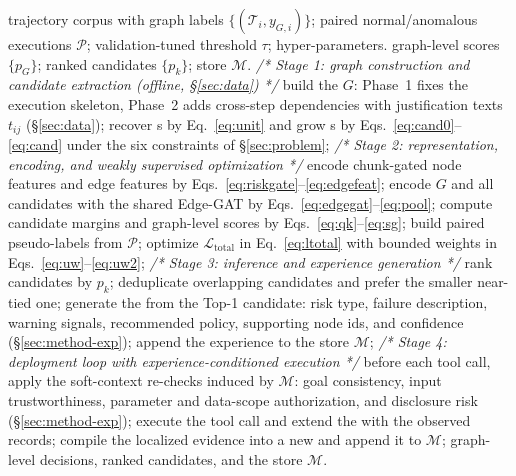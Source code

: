 \begin{algorithm}[htbp]
\caption{Training, Inference, and Deployment Procedure of the Proposed Framework}
\label{alg:framework}
\begin{algorithmic}[1]
\Require trajectory corpus with graph labels $\{(\mathcal{T}_i,y_{G,i})\}$; paired normal/anomalous executions $\mathcal{P}$; validation-tuned threshold $\tau$; hyper-parameters.
\Ensure graph-level scores $\{p_G\}$; ranked candidates $\{p_k\}$; \sexp{} store $\mathcal{M}$.
\State \textit{/* Stage 1: graph construction and candidate extraction (offline, \S\ref{sec:data}) */}
  \State build the \stg{} $G$: Phase~1 fixes the execution skeleton, Phase~2 adds cross-step dependencies with justification texts $t_{ij}$ (\S\ref{sec:data});
  \State recover \aeu{}s by Eq.~\eqref{eq:unit} and grow \csg{}s by Eqs.~\eqref{eq:cand0}--\eqref{eq:cand} under the six constraints of \S\ref{sec:problem};
\EndFor
\State \textit{/* Stage 2: representation, encoding, and weakly supervised optimization */}
    \State encode chunk-gated node features and edge features by Eqs.~\eqref{eq:riskgate}--\eqref{eq:edgefeat};
    \State encode $G$ and all candidates with the shared Edge-GAT by Eqs.~\eqref{eq:edgegat}--\eqref{eq:pool};
    \State compute candidate margins and graph-level scores by Eqs.~\eqref{eq:qk}--\eqref{eq:sg};
    \State build paired pseudo-labels from $\mathcal{P}$; optimize $\mathcal{L}_{\mathrm{total}}$ in Eq.~\eqref{eq:ltotal} with bounded weights in Eqs.~\eqref{eq:uw}--\eqref{eq:uw2};
  \EndFor
\EndFor
\State \textit{/* Stage 3: inference and experience generation */}
  \State rank candidates by $p_k$; deduplicate overlapping candidates and prefer the smaller near-tied one;
  \State generate the \sexp{} from the Top-1 candidate: risk type, failure description, warning signals, recommended policy, supporting node ids, and confidence (\S\ref{sec:method-exp});
  \State append the experience to the store $\mathcal{M}$;
\EndFor
\State \textit{/* Stage 4: deployment loop with experience-conditioned execution */}
  \State before each tool call, apply the soft-context re-checks induced by $\mathcal{M}$: goal consistency, input trustworthiness, parameter and data-scope authorization, and disclosure risk (\S\ref{sec:method-exp});
  \State execute the tool call and extend the \stg{} with the observed records;
    \State compile the localized evidence into a new \sexp{} and append it to $\mathcal{M}$;
  \EndIf
\EndWhile
\State \Return graph-level decisions, ranked candidates, and the \sexp{} store $\mathcal{M}$.
\end{algorithmic}
\end{algorithm}
